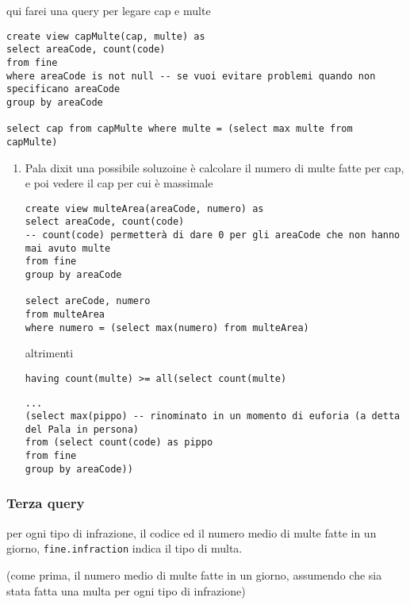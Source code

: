 \documentclass[11pt]{article}
\begin{document}
qui farei una query per legare cap e multe
\begin{verbatim}
create view capMulte(cap, multe) as
select areaCode, count(code)
from fine
where areaCode is not null -- se vuoi evitare problemi quando non specificano areaCode 
group by areaCode

select cap from capMulte where multe = (select max multe from capMulte)
\end{verbatim}
\begin{enumerate}
\item Pala dixit
\label{sec:org87369cf}
una possibile soluzoine è calcolare il numero di multe fatte per cap, e poi vedere il cap
per cui è massimale
\begin{verbatim}
create view multeArea(areaCode, numero) as
select areaCode, count(code)
-- count(code) permetterà di dare 0 per gli areaCode che non hanno mai avuto multe
from fine
group by areaCode

select areCode, numero
from multeArea
where numero = (select max(numero) from multeArea)
\end{verbatim}

altrimenti

\begin{verbatim}
having count(multe) >= all(select count(multe)
\end{verbatim}

\begin{verbatim}
...
(select max(pippo) -- rinominato in un momento di euforia (a detta del Pala in persona)
from (select count(code) as pippo
from fine
group by areaCode))
\end{verbatim}
\end{enumerate}

\subsubsection{Terza query}
\label{sec:org902778a}
per ogni tipo di infrazione, il codice ed il numero medio di multe fatte in un giorno,
\texttt{fine.infraction} indica il tipo di multa.

(come prima, il numero medio di multe fatte in un giorno, assumendo che sia stata fatta
una multa per ogni tipo di infrazione)
\end{document}
